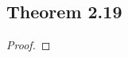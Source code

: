 \documentclass[../../main.tex]{subfiles}
\begin{document}
\subsection{Theorem 2.19}
\begin{wts}

\end{wts}
\begin{proof}

\end{proof}
\end{document}
